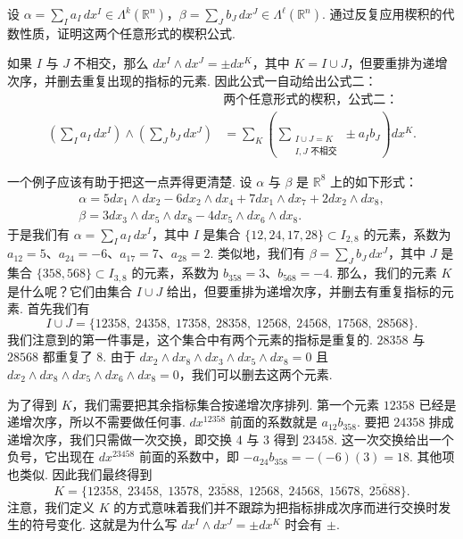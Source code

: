 \begin{question}\label{q:3-15}
设 $\alpha=\sum_{I}a_I\,dx^I\in\Lambda^k(\mathbb{R}^n)$，$\beta=\sum_{J}b_J\,dx^J\in\Lambda^\ell(\mathbb{R}^n)$. 通过反复应用楔积的代数性质，证明这两个任意形式的楔积公式.
\end{question}

如果 $I$ 与 $J$ 不相交，那么 $dx^I\wedge dx^J=\pm dx^K$，其中 $K=I\cup J$，但要重排为递增次序，并删去重复出现的指标的元素. 因此公式一自动给出公式二：
\begin{align*}
&\text{两个任意形式的楔积，公式二：}\\
\left(\sum_{I}a_I\,dx^I\right)\wedge\left(\sum_{J}b_J\,dx^J\right)
&=\sum_{K}\left(\sum_{\substack{I\cup J=K\\I,J\text{ 不相交}}}\pm a_Ib_J\right)dx^K.
\end{align*}

一个例子应该有助于把这一点弄得更清楚. 设 $\alpha$ 与 $\beta$ 是 $\mathbb{R}^8$ 上的如下形式：
\begin{align*}
\alpha=5dx_1\wedge dx_2-6dx_2\wedge dx_4+7dx_1\wedge dx_7+2dx_2\wedge dx_8, \\
\beta=3dx_3\wedge dx_5\wedge dx_8-4dx_5\wedge dx_6\wedge dx_8.
\end{align*}
于是我们有 $\alpha=\sum_{I}a_I\,dx^I$，其中 $I$ 是集合 $\{12,24,17,28\}\subset I_{2,8}$ 的元素，系数为 $a_{12}=5$、$a_{24}=-6$、$a_{17}=7$、$a_{28}=2$. 类似地，我们有 $\beta=\sum_{J}b_J\,dx^J$，其中 $J$ 是集合 $\{358,568\}\subset I_{3,8}$ 的元素，系数为 $b_{358}=3$、$b_{568}=-4$. 那么，我们的元素 $K$ 是什么呢？它们由集合 $I\cup J$ 给出，但要重排为递增次序，并删去有重复指标的元素. 首先我们有
\[
I\cup J=\{12358,\;24358,\;17358,\;28358,\;12568,\;24568,\;17568,\;28568\}.
\]
我们注意到的第一件事是，这个集合中有两个元素的指标是重复的. $28358$ 与 $28568$ 都重复了 8. 由于 $dx_2\wedge dx_8\wedge dx_3\wedge dx_5\wedge dx_8=0$ 且 $dx_2\wedge dx_8\wedge dx_5\wedge dx_6\wedge dx_8=0$，我们可以删去这两个元素.

为了得到 $K$，我们需要把其余指标集合按递增次序排列. 第一个元素 $12358$ 已经是递增次序，所以不需要做任何事. $dx^{12358}$ 前面的系数就是 $a_{12}b_{358}$. 要把 $24358$ 排成递增次序，我们只需做一次交换，即交换 4 与 3 得到 $23458$. 这一次交换给出一个负号，它出现在 $dx^{23458}$ 前面的系数中，即 $-a_{24}b_{358}=-(-6)(3)=18$. 其他项也类似. 因此我们最终得到
\[
K=\{12358,\;23458,\;13578,\;\overline{23588},\;12568,\;24568,\;15678,\;\overline{25688}\}.
\]
注意，我们定义 $K$ 的方式意味着我们并不跟踪为把指标排成次序而进行交换时发生的符号变化. 这就是为什么写 $dx^I\wedge dx^J=\pm dx^K$ 时会有 $\pm$.

